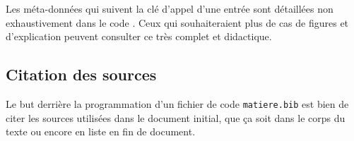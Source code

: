 \documentclass[a4paper, 11pt, twoside, fleqn]{memoir}
\begin{document}
Les méta-données qui suivent la clé d'appel d'une entrée sont détaillées non exhaustivement dans le code . Ceux qui souhaiteraient plus de cas de figures et d'explication peuvent consulter ce  très complet et didactique.

		\subsection{Citation des sources}
		
Le but derrière la programmation d'un fichier de code \texttt{matiere.bib} est bien de citer les sources utilisées dans le document initial, que ça soit dans le corps du texte ou encore en liste en fin de document.
\end{document}
